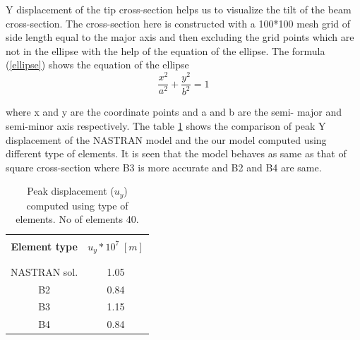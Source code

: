 \documentclass[a4paper,12pt]{article}
\begin{document}
Y displacement of the tip cross-section helps us to visualize the tilt of the beam cross-section. The cross-section here is constructed with a 100*100 mesh grid of side length equal to the major axis and then excluding the grid points which are not in the ellipse with the help of the equation of the ellipse. The formula (\ref{ellipse}) shows the equation of the ellipse
\\
\begin{equation}
\frac{x^{2}}{a^{2}} + \frac{y^{2}}{b^{2}} = 1
\label{ellipse}
\end{equation}

where x and y are the coordinate points and a and b are the semi- major and semi-minor axis respectively. The table \ref{tab:table 10}  shows the comparison of peak Y displacement of the NASTRAN model and the our model computed using different type of elements. It is seen that the model behaves as same as that of square cross-section where B3 is more accurate and B2 and B4 are same.
\\
\begin{table}[h!]
  \begin{center}
     \begin{tabular}{c c}
      \hline\\
      \textbf{Element type} & \textbf{$u_{y}*10^{7}\;[m]$} \\
      \\
      \hline
      \\[-2pt]
       NASTRAN sol. & 1.05 \\[5pt]
       B2 & 0.84\\[5pt]
       B3 & 1.15 \\[5pt]
       B4 & 0.84 \\[5pt]

      \hline
     \end{tabular}
    \caption{Peak displacement ($u_{y}$) computed  using type of elements. No of elements 40.}
    \label{tab:table 10}
  \end{center}
\end{table}
\end{document}
